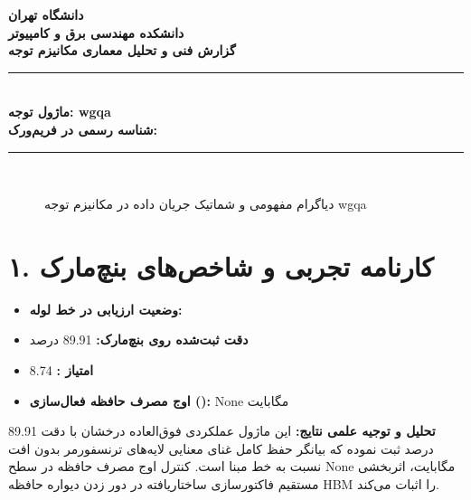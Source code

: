 \documentclass[12pt,a4paper]{article}
\begin{document}
\begin{center}
{\Large\bfseries دانشگاه تهران}\\[0.2cm]
{\large\bfseries دانشکده مهندسی برق و کامپیوتر}\\[0.2cm]
{\large\bfseries گزارش فنی و تحلیل معماری مکانیزم توجه}\\[0.5cm]
\rule{\linewidth}{1pt}\\[0.3cm]
{\LARGE\bfseries ماژول توجه: wgqa}\\[0.2cm]
{\large \textbf{شناسه رسمی در فریم‌ورک:} }\\[0.2cm]
\rule{\linewidth}{1pt}\\[0.5cm]
\end{center}

\begin{figure}[H]
\centering
{}
\caption{دیاگرام مفهومی و شماتیک جریان داده در مکانیزم توجه wgqa}
\end{figure}

\section*{۱. کارنامه تجربی و شاخص‌های بنچ‌مارک}
\begin{itemize}
\item \textbf{وضعیت ارزیابی در خط لوله:} 
\item \textbf{دقت ثبت‌شده روی بنچ‌مارک:} 89.91 درصد
\item \textbf{امتیاز :} 8.74
\item \textbf{اوج مصرف حافظه فعال‌سازی ():} None مگابایت
\end{itemize}
\textbf{تحلیل و توجیه علمی نتایج:} این ماژول عملکردی فوق‌العاده درخشان با دقت 89.91 درصد ثبت نموده که بیانگر حفظ کامل غنای معنایی لایه‌های ترنسفورمر بدون افت نسبت به خط مبنا است. کنترل اوج مصرف حافظه در سطح None مگابایت، اثربخشی مستقیم فاکتورسازی ساختاریافته در دور زدن دیواره حافظه HBM را اثبات می‌کند.
\end{document}
